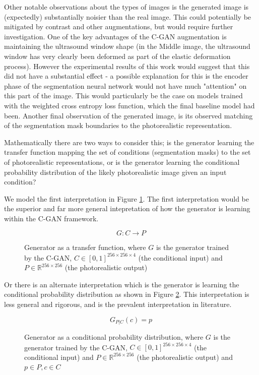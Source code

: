 Other notable observations about the types of images is the generated image is
(expectedly) substantially noisier than the real image. This could potentially
be mitigated by contrast and other augmentations, but would require further
investigation. One of the key advantages of the C-GAN augmentation is
maintaining the ultrasound window shape (in the Middle image, the ultrasound
window has very clearly been deformed as part of the elastic deformation
process). However the experimental results of this work would suggest that this
did not have a substantial effect - a possible explanation for this is the
encoder phase of the segmentation neural network would not have much "attention"
on this part of the image. This would particularly be the case on models trained
with the weighted cross entropy loss function, which the final baseline model
had been. Another final observation of the generated image, is its observed
matching of the segmentation mask boundaries to the photorealistic
representation. \newline

Mathematically there are two ways to consider this; is the generator learning
the transfer function mapping the set of conditions (segmentation masks) to the
set of photorealistic representations, or is the generator learning the
conditional probability distribution of the likely photorealistic image given an
input condition? \newline

We model the first interpretation in Figure \ref{eqn:txfn}. The first
interpretation would be the superior and far more general intepretation of how
the generator is learning within the C-GAN framework. \newline 

\begin{figure}[h]
    \[G: C \rightarrow P\]
    \caption{Generator as a transfer function, where $G$ is the generator trained by the C-GAN, $C \in [0,1]^{256\times256\times4}$ (the conditional input) and $P \in \mathbb{R}^{256\times256}$ (the photorealistic output)}
    \label{eqn:txfn}
\end{figure}


Or there is an alternate interpretation which is the generator is learning the
conditional probability distribution as shown in Figure \ref{eqn:probd}. This
interpretation is less general and rigorous, and is the prevalent interpretation
in literature. \newline

\begin{figure}[H]
    \[G_{P|C}(c) = p\]
    \caption{Generator as a conditional probability distribution, where $G$ is the generator trained by the C-GAN, $C \in [0,1]^{256\times256\times4}$ (the conditional input) and $P \in \mathbb{R}^{256\times256}$ (the photorealistic output) and $p \in P, c \in C$}
    \label{eqn:probd}
\end{figure}

